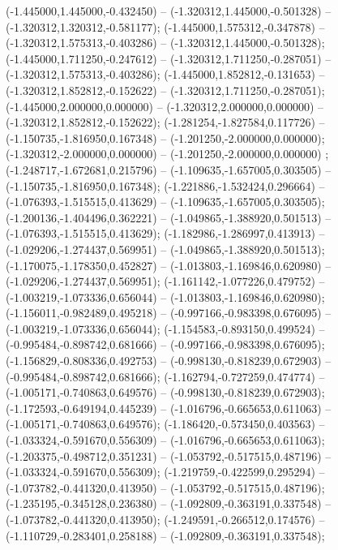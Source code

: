  (-1.445000,1.445000,-0.432450) -- (-1.320312,1.445000,-0.501328) -- (-1.320312,1.320312,-0.581177);
 (-1.445000,1.575312,-0.347878) -- (-1.320312,1.575313,-0.403286) -- (-1.320312,1.445000,-0.501328);
 (-1.445000,1.711250,-0.247612) -- (-1.320312,1.711250,-0.287051) -- (-1.320312,1.575313,-0.403286);
 (-1.445000,1.852812,-0.131653) -- (-1.320312,1.852812,-0.152622) -- (-1.320312,1.711250,-0.287051);
 (-1.445000,2.000000,0.000000) -- (-1.320312,2.000000,0.000000) -- (-1.320312,1.852812,-0.152622);
 (-1.281254,-1.827584,0.117726) -- (-1.150735,-1.816950,0.167348) -- (-1.201250,-2.000000,0.000000);
 (-1.320312,-2.000000,0.000000) -- (-1.201250,-2.000000,0.000000) ;
 (-1.248717,-1.672681,0.215796) -- (-1.109635,-1.657005,0.303505) -- (-1.150735,-1.816950,0.167348);
 (-1.221886,-1.532424,0.296664) -- (-1.076393,-1.515515,0.413629) -- (-1.109635,-1.657005,0.303505);
 (-1.200136,-1.404496,0.362221) -- (-1.049865,-1.388920,0.501513) -- (-1.076393,-1.515515,0.413629);
 (-1.182986,-1.286997,0.413913) -- (-1.029206,-1.274437,0.569951) -- (-1.049865,-1.388920,0.501513);
 (-1.170075,-1.178350,0.452827) -- (-1.013803,-1.169846,0.620980) -- (-1.029206,-1.274437,0.569951);
 (-1.161142,-1.077226,0.479752) -- (-1.003219,-1.073336,0.656044) -- (-1.013803,-1.169846,0.620980);
 (-1.156011,-0.982489,0.495218) -- (-0.997166,-0.983398,0.676095) -- (-1.003219,-1.073336,0.656044);
 (-1.154583,-0.893150,0.499524) -- (-0.995484,-0.898742,0.681666) -- (-0.997166,-0.983398,0.676095);
 (-1.156829,-0.808336,0.492753) -- (-0.998130,-0.818239,0.672903) -- (-0.995484,-0.898742,0.681666);
 (-1.162794,-0.727259,0.474774) -- (-1.005171,-0.740863,0.649576) -- (-0.998130,-0.818239,0.672903);
 (-1.172593,-0.649194,0.445239) -- (-1.016796,-0.665653,0.611063) -- (-1.005171,-0.740863,0.649576);
 (-1.186420,-0.573450,0.403563) -- (-1.033324,-0.591670,0.556309) -- (-1.016796,-0.665653,0.611063);
 (-1.203375,-0.498712,0.351231) -- (-1.053792,-0.517515,0.487196) -- (-1.033324,-0.591670,0.556309);
 (-1.219759,-0.422599,0.295294) -- (-1.073782,-0.441320,0.413950) -- (-1.053792,-0.517515,0.487196);
 (-1.235195,-0.345128,0.236380) -- (-1.092809,-0.363191,0.337548) -- (-1.073782,-0.441320,0.413950);
 (-1.249591,-0.266512,0.174576) -- (-1.110729,-0.283401,0.258188) -- (-1.092809,-0.363191,0.337548);
